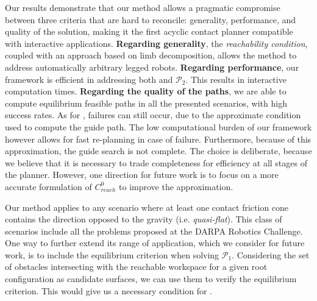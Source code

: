 Our results demonstrate that our method allows a pragmatic compromise between three 
criteria that are hard to reconcile: generality, performance, and quality of the solution, making it the first acyclic contact
planner compatible with \gls{interactive} applications.
%
\textbf{Regarding generality}, the \textit{reachability condition}, coupled with an approach based on limb decomposition, 
allows the method to address automatically arbitrary legged robots.
%
\textbf{Regarding performance}, our framework is efficient in addressing both \Pa and $\mathcal{P}_2$. This results in \gls{interactive} computation times.
%
\textbf{Regarding the quality of the paths}, we are able to compute
\gls{equilibrium feasible} paths in all the presented scenarios, with high success rates.
As for \cite{Bouyarmane2009}, failures can still occur, due to the approximate condition used to compute the guide path.
The low computational burden of our framework however allows for fast re-planning in case of failure.
Furthermore, because of this approximation, the guide search is not complete. The choice is deliberate, because we believe
that it is necessary to trade completeness for efficiency at all stages of the planner.
However, one direction for future work is to focus on a more accurate formulation of $C_{reach}^0$ to improve
the approximation.

Our method applies to any scenario where at least one contact friction cone contains
the direction opposed to the gravity (i.e. \textit{quasi-flat}). This class of scenarios include all the problems proposed at the DARPA Robotics Challenge.
One way to further extend its range of application, which we consider for future work, is to include the equilibrium criterion when solving $\mathcal{P}_1$.
Considering the set of obstacles intersecting with the reachable workspace for a given root configuration as candidate surfaces, we can use them to verify the equilibrium criterion.
This would give us a necessary condition for \equilibriumfeasibility.

